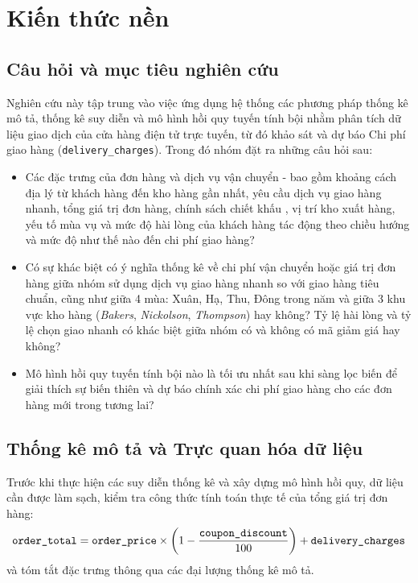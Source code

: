 	\section{Kiến thức nền}
	\subsection{Câu hỏi và mục tiêu nghiên cứu}	
	Nghiên cứu này tập trung vào việc ứng dụng hệ thống các phương pháp thống kê mô tả, thống kê suy diễn và mô hình hồi quy tuyến tính bội nhằm phân tích dữ liệu giao dịch của cửa hàng điện tử trực tuyến, từ đó khảo sát và dự báo Chi phí giao hàng (\texttt{delivery\_charges}). Trong đó nhóm đặt ra những câu hỏi sau:
	
	\begin{itemize}
		\item Các đặc trưng của đơn hàng và dịch vụ vận chuyển - bao gồm khoảng cách địa lý từ khách hàng đến kho hàng gần nhất, yêu cầu dịch vụ giao hàng nhanh, tổng giá trị đơn hàng, chính sách chiết khấu , vị trí kho xuất hàng, yếu tố mùa vụ  và mức độ hài lòng của khách hàng tác động theo chiều hướng và mức độ như thế nào đến chi phí giao hàng?
		\item Có sự khác biệt có ý nghĩa thống kê về chi phí vận chuyển hoặc giá trị đơn hàng giữa nhóm sử dụng dịch vụ giao hàng nhanh so với giao hàng tiêu chuẩn, cũng như giữa 4 mùa: Xuân, Hạ, Thu, Đông trong năm và giữa 3 khu vực kho hàng (\textit{Bakers}, \textit{Nickolson}, \textit{Thompson}) hay không? Tỷ lệ hài lòng và tỷ lệ chọn giao nhanh có khác biệt giữa nhóm có và không có mã giảm giá hay không?
		\item Mô hình hồi quy tuyến tính bội nào là tối ưu nhất sau khi sàng lọc biến để giải thích sự biến thiên và dự báo chính xác chi phí giao hàng cho các đơn hàng mới trong tương lai?
	\end{itemize}
	
	
	\subsection{Thống kê mô tả và Trực quan hóa dữ liệu}
	
	Trước khi thực hiện các suy diễn thống kê và xây dựng mô hình hồi quy, dữ liệu cần được làm sạch, kiểm tra công thức tính toán thực tế của tổng giá trị đơn hàng:
	\begin{equation}
		\text{\texttt{order\_total}} = \text{\texttt{order\_price}} \times \left(1 - \frac{\text{\texttt{coupon\_discount}}}{100}\right) + \text{\texttt{delivery\_charges}}
	\end{equation}
	và tóm tắt đặc trưng thông qua các đại lượng thống kê mô tả.
	
